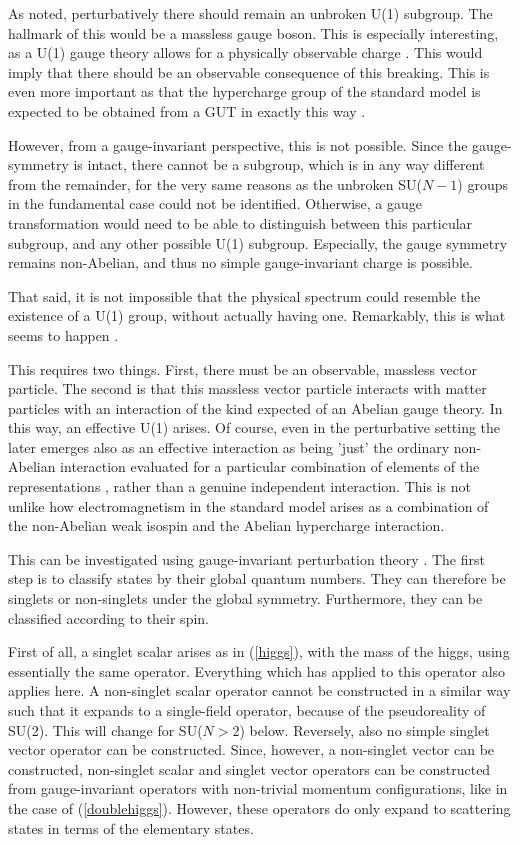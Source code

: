 \documentclass[final,12pt]{article}
\newcommand*{\pref}[1]{(\ref{#1})}
\newcommand*{\1}{1\!\!\!\bot}
\begin{document}
As noted, perturbatively there should remain an unbroken U(1) subgroup. The hallmark of this would be a massless gauge boson. This is especially interesting, as a U(1) gauge theory allows for a physically observable charge \cite{Haag:1992hx}. This would imply that there should be an observable consequence of this breaking. This is even more important as that the hypercharge group of the standard model is expected to be obtained from a GUT in exactly this way \cite{Bohm:2001yx,Langacker:1980js}.

However, from a gauge-invariant perspective, this is not possible. Since the gauge-symmetry is intact, there cannot be a subgroup, which is in any way different from the remainder, for the very same reasons as the unbroken SU($N-1$) groups in the fundamental case could not be identified. Otherwise, a gauge transformation would need to be able to distinguish between this particular subgroup, and any other possible U(1) subgroup. Especially, the gauge symmetry remains non-Abelian, and thus no simple gauge-invariant charge is possible.

That said, it is not impossible that the physical spectrum could resemble the existence of a U(1) group, without actually having one. Remarkably, this is what seems to happen \cite{Maas:2017xzh}.

This requires two things. First, there must be an observable, massless vector particle. The second is that this massless vector particle interacts with matter particles with an interaction of the kind expected of an Abelian gauge theory. In this way, an effective U(1) arises. Of course, even in the perturbative setting the later emerges also as an effective interaction as being 'just' the ordinary non-Abelian interaction evaluated for a particular combination of elements of the representations \cite{Bohm:2001yx}, rather than a genuine independent interaction. This is not unlike how electromagnetism in the standard model arises as a combination of the non-Abelian weak isospin and the Abelian hypercharge interaction.

This can be investigated using gauge-invariant perturbation theory \cite{Kondo:2016ywd,Maas:2017xzh}. The first step is to classify states by their global quantum numbers. They can therefore be singlets or non-singlets under the global symmetry. Furthermore, they can be classified according to their spin.

First of all, a singlet scalar arises as in \pref{higgs}, with the mass of the higgs, using essentially the same operator. Everything which has applied to this operator also applies here. A non-singlet scalar operator cannot be constructed in a similar way such that it expands to a single-field operator, because of the pseudoreality of SU(2). This will change for SU($N>2$) below. Reversely, also no simple singlet vector operator can be constructed. Since, however, a non-singlet vector can be constructed, non-singlet scalar and singlet vector operators can be constructed from gauge-invariant operators with non-trivial momentum configurations, like in the case of \pref{doublehiggs}. However, these operators do only expand to scattering states in terms of the elementary states.
\end{document}
